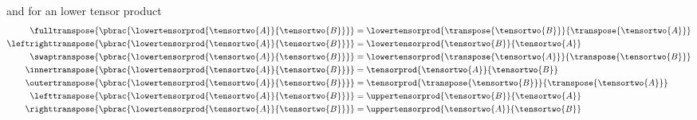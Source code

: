 and for an lower tensor product
\begin{align}
  \fulltranspose{\pbrac{\lowertensorprod{\tensortwo{A}}{\tensortwo{B}}}}&=\lowertensorprod{\transpose{\tensortwo{B}}}{\transpose{\tensortwo{A}}}  \label{eqn:FullTransposeLowerProductTwoTwoTensor} \\
  \leftrighttranspose{\pbrac{\lowertensorprod{\tensortwo{A}}{\tensortwo{B}}}}&=\lowertensorprod{\tensortwo{B}}{\tensortwo{A}}  \label{eqn:LeftRightTransposeLowerProductTwoTwoTensor} \\
  \swaptranspose{\pbrac{\lowertensorprod{\tensortwo{A}}{\tensortwo{B}}}}&=\lowertensorprod{\transpose{\tensortwo{A}}}{\transpose{\tensortwo{B}}}   \label{eqn:SwapTransposeLowerProductTwoTwoTensor} \\
  \innertranspose{\pbrac{\lowertensorprod{\tensortwo{A}}{\tensortwo{B}}}}&=\tensorprod{\tensortwo{A}}{\tensortwo{B}}   \label{eqn:InnerTransposeLowerProductTwoTwoTensor} \\
  \outertranspose{\pbrac{\lowertensorprod{\tensortwo{A}}{\tensortwo{B}}}}&=\tensorprod{\transpose{\tensortwo{B}}}{\transpose{\tensortwo{A}}}   \label{eqn:OuterTransposeLowerProductTwoTwoTensor} \\
  \lefttranspose{\pbrac{\lowertensorprod{\tensortwo{A}}{\tensortwo{B}}}}&=\uppertensorprod{\tensortwo{B}}{\tensortwo{A}}   \label{eqn:LeftTransposeLowerProductTwoTwoTensor} \\
  \righttranspose{\pbrac{\lowertensorprod{\tensortwo{A}}{\tensortwo{B}}}}&=\uppertensorprod{\tensortwo{A}}{\tensortwo{B}}   \label{eqn:RightTransposeLowerProductTwoTwoTensor} 
\end{align}

